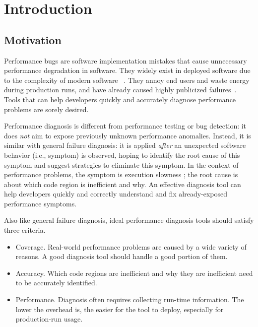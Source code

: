\section{Introduction}
\label{sec:intro}
\subsection{Motivation}

Performance bugs 
are software implementation mistakes that cause unnecessary performance
degradation in software. They widely exist in deployed software due to the 
complexity of modern software
~\cite{PerfBug,perf.fse10,rily.perftest,Alabama,perfantipattern,SongOOPSLA2014,xiao13:context}. 
They annoy end users and waste energy during production runs, and 
have already caused highly publicized failures~\cite{ACA-health,colorado}.
Tools that can help
developers quickly and accurately diagnose performance problems
are sorely desired.

Performance diagnosis is different from performance testing or
bug detection: it does \textit{not} aim to expose previously unknown performance
anomalies. 
Instead, it is similar with general failure diagnosis: 
it is applied \textit{after} an unexpected software behavior (i.e., symptom)
is observed, hoping to identify the root cause of this symptom and suggest
strategies to eliminate this symptom.
In the context of performance problems, the symptom is execution 
slowness \cite{SongOOPSLA2014}; the root cause is about
which code region is inefficient and why.
An effective diagnosis tool can help developers quickly and correctly understand 
and fix already-exposed performance symptoms.


Also like general failure diagnosis, ideal performance diagnosis tools should
satisfy three criteria.
\begin{itemize}
\item Coverage. 
Real-world performance problems are caused by a wide variety of reasons.
A good diagnosis tool should handle a good portion of them.

\item Accuracy. 
Which code regions are inefficient and why they are inefficient
need to be accurately identified.

\item Performance. 
Diagnosis often requires collecting run-time information. The lower the overhead
is, the easier for the tool to deploy, especially for 
production-run usage. 
\end{itemize}


